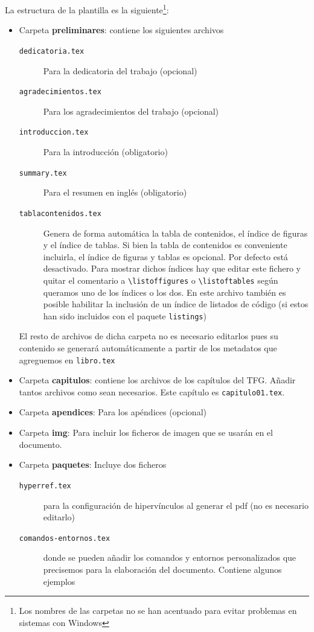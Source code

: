 La estructura de la plantilla es la siguiente\footnote{Los nombres de las carpetas no se han acentuado para evitar problemas en sistemas con Windows}: 
\begin{itemize}
  \item Carpeta \textbf{preliminares}: contiene los siguientes archivos
    \begin{description}
      \item[\texttt{dedicatoria.tex}] Para la dedicatoria del trabajo (opcional)
      \item[\texttt{agradecimientos.tex}] Para los agradecimientos del trabajo (opcional)
      \item[\texttt{introduccion.tex}] Para la introducción (obligatorio)
      \item[\texttt{summary.tex}] Para el resumen en inglés (obligatorio)
      \item[\texttt{tablacontenidos.tex}] Genera de forma automática la tabla de contenidos, el índice de figuras y el índice de tablas. Si bien la tabla de contenidos es conveniente incluirla, el índice de figuras y tablas es opcional. Por defecto está desactivado. Para mostrar dichos índices hay que editar este fichero y quitar el comentario a \verb+\listoffigures+ o \verb+\listoftables+ según queramos uno de los índices o los dos. En este archivo también es posible habilitar la inclusión de un índice de listados de código (si estos han sido incluidos con el paquete \texttt{listings})
  \end{description}
  El resto de archivos de dicha carpeta no es necesario editarlos pues su contenido se generará automáticamente a partir de los metadatos que agreguemos en \texttt{libro.tex}

  \item Carpeta \textbf{capitulos}: contiene los archivos de los capítulos del TFG. Añadir tantos archivos como sean necesarios. Este capítulo es \texttt{capitulo01.tex}.

  \item Carpeta \textbf{apendices}: Para los apéndices (opcional)
  \item Carpeta \textbf{img}: Para incluir los ficheros de imagen que se usarán en el documento.
  \item Carpeta \textbf{paquetes}: Incluye dos ficheros 
    \begin{description}
      \item[\texttt{hyperref.tex}] para la configuración de hipervínculos al generar el pdf (no es necesario editarlo) 
      \item[\texttt{comandos-entornos.tex}] donde se pueden añadir los comandos y entornos personalizados que precisemos para la elaboración del documento. Contiene algunos ejemplos
    \end{description}
    

\end{itemize}
